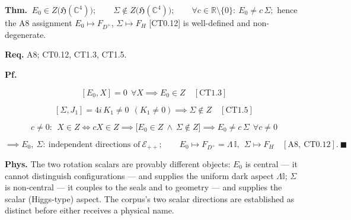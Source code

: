 \begin{theorem}\label{tag:CT1-11}
\textbf{Thm.} $\ E_0\in Z\bigl(\mathfrak H(\mathbb C^4)\bigr);\qquad\Sigma\notin Z\bigl(\mathfrak H(\mathbb C^4)\bigr);\qquad\forall c\in\mathbb R\setminus\{0\}:\ E_0\ne c\,\Sigma;$ hence the A8 assignment $E_0\mapsto F_{D^+}$, $\Sigma\mapsto F_H$ [CT0.12] is well-defined and non-degenerate.

\textbf{Req.} A8; CT0.12, CT1.3, CT1.5.

\textbf{Pf.}

\[
[E_0,X]=0\ \ \forall X\implies E_0\in Z\quad[\mathrm{CT1.3}]
\]

\[
[\Sigma,J_1]=4i\,K_1\ne0\ \ (K_1\ne0)\implies\Sigma\notin Z\quad[\mathrm{CT1.5}]
\]

\[
c\ne0:\ \ X\in Z\iff cX\in Z\implies\bigl[E_0\in Z\ \wedge\ \Sigma\notin Z\bigr]\implies E_0\ne c\,\Sigma\ \ \forall c\ne0
\]

\[
\implies E_0,\ \Sigma:\ \text{independent directions of}\ \mathcal E_{++};\qquad
E_0\mapsto F_{D^+}=\Lambda\,\mathbb I,\ \ \Sigma\mapsto F_H\quad[\mathrm{A8},\ \mathrm{CT0.12}].\ \blacksquare
\]

\textbf{Phys.} The two rotation scalars are provably different objects: $E_0$ is central — it cannot distinguish configurations — and supplies the uniform dark aspect $\Lambda\mathbb I$; $\Sigma$ is non-central — it couples to the seals and to geometry — and supplies the scalar (Higgs-type) aspect. The corpus’s two scalar directions are established as distinct before either receives a physical name.

\end{theorem}

